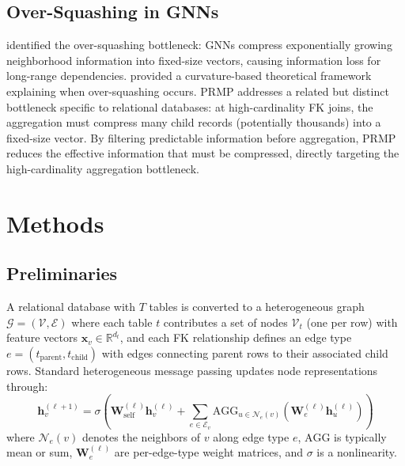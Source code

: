\documentclass[11pt,letterpaper]{article}
\begin{document}
\subsection{Over-Squashing in GNNs}

\citet{Alon2021} identified the over-squashing bottleneck: GNNs compress exponentially growing neighborhood information into fixed-size vectors, causing information loss for long-range dependencies. \citet{Topping2022} provided a curvature-based theoretical framework explaining when over-squashing occurs. PRMP addresses a related but distinct bottleneck specific to relational databases: at high-cardinality FK joins, the aggregation must compress many child records (potentially thousands) into a fixed-size vector. By filtering predictable information before aggregation, PRMP reduces the effective information that must be compressed, directly targeting the high-cardinality aggregation bottleneck.

\section{Methods}
\label{sec:methods}

\subsection{Preliminaries}

A relational database with $T$ tables is converted to a heterogeneous graph $\mathcal{G} = (\mathcal{V}, \mathcal{E})$ where each table $t$ contributes a set of nodes $\mathcal{V}_t$ (one per row) with feature vectors $\mathbf{x}_v \in \mathbb{R}^{d_t}$, and each FK relationship defines an edge type $e = (t_{\text{parent}}, t_{\text{child}})$ with edges connecting parent rows to their associated child rows. Standard heterogeneous message passing \citep{Hamilton2017, Schlichtkrull2018} updates node representations through:
\begin{equation}
\mathbf{h}_v^{(\ell+1)} = \sigma\!\left(\mathbf{W}^{(\ell)}_{\text{self}} \mathbf{h}_v^{(\ell)} + \sum_{e \in \mathcal{E}_v} \text{AGG}_{u \in \mathcal{N}_e(v)} \left( \mathbf{W}^{(\ell)}_e \mathbf{h}_u^{(\ell)} \right) \right)
\label{eq:standard_mp}
\end{equation}
where $\mathcal{N}_e(v)$ denotes the neighbors of $v$ along edge type $e$, $\text{AGG}$ is typically mean or sum, $\mathbf{W}^{(\ell)}_e$ are per-edge-type weight matrices, and $\sigma$ is a nonlinearity.
\end{document}

